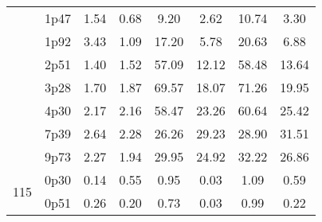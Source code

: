 \documentclass[12pt,A4paper]{article}
\begin{document}
\begin{table}[]
\begin{tabular}{llllllll}
\multicolumn{1}{|l|}{} & \multicolumn{1}{l|}{1p47} & \multicolumn{1}{c|}{1.54}        & \multicolumn{1}{c|}{0.68}         & \multicolumn{1}{c|}{9.20}        & \multicolumn{1}{c|}{2.62}         & \multicolumn{1}{c|}{10.74}        & \multicolumn{1}{c|}{3.30}         \\ \cline{2-8}
\multicolumn{1}{|l|}{} & \multicolumn{1}{l|}{1p92} & \multicolumn{1}{c|}{3.43}        & \multicolumn{1}{c|}{1.09}         & \multicolumn{1}{c|}{17.20}        & \multicolumn{1}{c|}{5.78}         & \multicolumn{1}{c|}{20.63}        & \multicolumn{1}{c|}{6.88}         \\ \cline{2-8}
\multicolumn{1}{|l|}{} & \multicolumn{1}{l|}{2p51} & \multicolumn{1}{c|}{1.40}        & \multicolumn{1}{c|}{1.52}         & \multicolumn{1}{c|}{57.09}        & \multicolumn{1}{c|}{12.12}         & \multicolumn{1}{c|}{58.48}        & \multicolumn{1}{c|}{13.64}         \\ \cline{2-8}
\multicolumn{1}{|l|}{} & \multicolumn{1}{l|}{3p28} & \multicolumn{1}{c|}{1.70}        & \multicolumn{1}{c|}{1.87}         & \multicolumn{1}{c|}{69.57}        & \multicolumn{1}{c|}{18.07}         & \multicolumn{1}{c|}{71.26}        & \multicolumn{1}{c|}{19.95}         \\ \cline{2-8}
\multicolumn{1}{|l|}{} & \multicolumn{1}{l|}{4p30} & \multicolumn{1}{c|}{2.17}        & \multicolumn{1}{c|}{2.16}         & \multicolumn{1}{c|}{58.47}        & \multicolumn{1}{c|}{23.26}         & \multicolumn{1}{c|}{60.64}        & \multicolumn{1}{c|}{25.42}         \\ \cline{2-8}
\multicolumn{1}{|l|}{} & \multicolumn{1}{l|}{7p39} & \multicolumn{1}{c|}{2.64}        & \multicolumn{1}{c|}{2.28}         & \multicolumn{1}{c|}{26.26}        & \multicolumn{1}{c|}{29.23}         & \multicolumn{1}{c|}{28.90}        & \multicolumn{1}{c|}{31.51}         \\ \cline{2-8}
\multicolumn{1}{|l|}{} & \multicolumn{1}{l|}{9p73} & \multicolumn{1}{c|}{2.27}        & \multicolumn{1}{c|}{1.94}         & \multicolumn{1}{c|}{29.95}        & \multicolumn{1}{c|}{24.92}         & \multicolumn{1}{c|}{32.22}        & \multicolumn{1}{c|}{26.86}         \\ \hline
\multicolumn{1}{|l|}{\multirow{12}{*}{115}} & \multicolumn{1}{l|}{0p30} & \multicolumn{1}{c|}{0.14}        & \multicolumn{1}{c|}{0.55}         & \multicolumn{1}{c|}{0.95}        & \multicolumn{1}{c|}{0.03}         & \multicolumn{1}{c|}{1.09}        & \multicolumn{1}{c|}{0.59}         \\ \cline{2-8} 
\multicolumn{1}{|l|}{} & \multicolumn{1}{l|}{0p51} & \multicolumn{1}{c|}{0.26}        & \multicolumn{1}{c|}{0.20}         & \multicolumn{1}{c|}{0.73}        & \multicolumn{1}{c|}{0.03}         & \multicolumn{1}{c|}{0.99}        & \multicolumn{1}{c|}{0.22}         \\ \cline{2-8}

\end{tabular}
\end{table}
\end{document}
